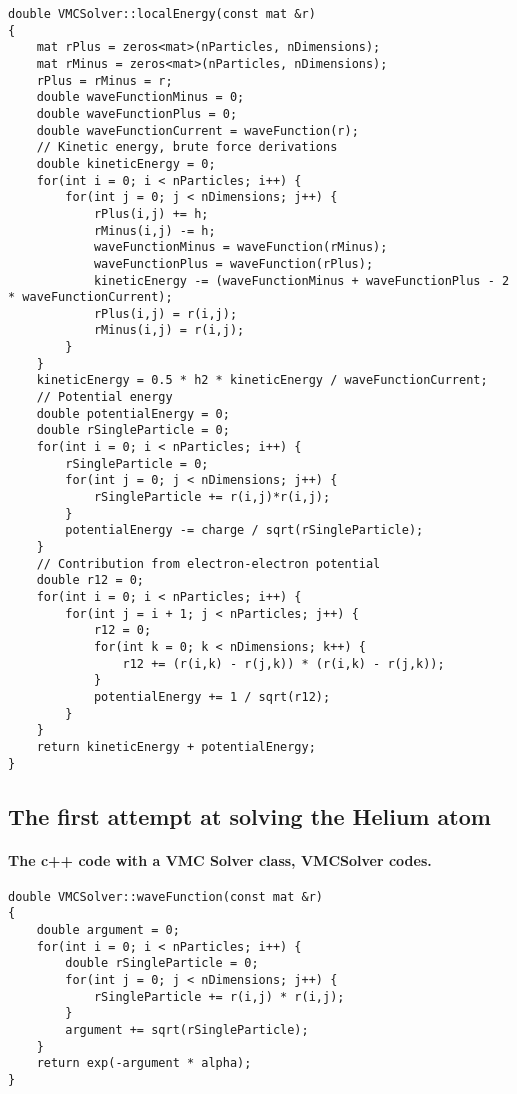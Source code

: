 \documentclass[%
twoside,                 %
final,                   %
10pt]{article}
\begin{document}
\begin{verbatim}
double VMCSolver::localEnergy(const mat &r)
{
    mat rPlus = zeros<mat>(nParticles, nDimensions);
    mat rMinus = zeros<mat>(nParticles, nDimensions);
    rPlus = rMinus = r;
    double waveFunctionMinus = 0;
    double waveFunctionPlus = 0;
    double waveFunctionCurrent = waveFunction(r);
    // Kinetic energy, brute force derivations
    double kineticEnergy = 0;
    for(int i = 0; i < nParticles; i++) {
        for(int j = 0; j < nDimensions; j++) {
            rPlus(i,j) += h;
            rMinus(i,j) -= h;
            waveFunctionMinus = waveFunction(rMinus);
            waveFunctionPlus = waveFunction(rPlus);
            kineticEnergy -= (waveFunctionMinus + waveFunctionPlus - 2 * waveFunctionCurrent);
            rPlus(i,j) = r(i,j);
            rMinus(i,j) = r(i,j);
        }
    }
    kineticEnergy = 0.5 * h2 * kineticEnergy / waveFunctionCurrent;
    // Potential energy
    double potentialEnergy = 0;
    double rSingleParticle = 0;
    for(int i = 0; i < nParticles; i++) {
        rSingleParticle = 0;
        for(int j = 0; j < nDimensions; j++) {
            rSingleParticle += r(i,j)*r(i,j);
        }
        potentialEnergy -= charge / sqrt(rSingleParticle);
    }
    // Contribution from electron-electron potential
    double r12 = 0;
    for(int i = 0; i < nParticles; i++) {
        for(int j = i + 1; j < nParticles; j++) {
            r12 = 0;
            for(int k = 0; k < nDimensions; k++) {
                r12 += (r(i,k) - r(j,k)) * (r(i,k) - r(j,k));
            }
            potentialEnergy += 1 / sqrt(r12);
        }
    }
    return kineticEnergy + potentialEnergy;
}
\end{verbatim}




\subsection*{The first attempt at solving the Helium atom}

\paragraph{The c++ code with a VMC Solver class, VMCSolver codes.}

\begin{verbatim}
double VMCSolver::waveFunction(const mat &r)
{
    double argument = 0;
    for(int i = 0; i < nParticles; i++) {
        double rSingleParticle = 0;
        for(int j = 0; j < nDimensions; j++) {
            rSingleParticle += r(i,j) * r(i,j);
        }
        argument += sqrt(rSingleParticle);
    }
    return exp(-argument * alpha);
}
\end{verbatim}
\end{document}
